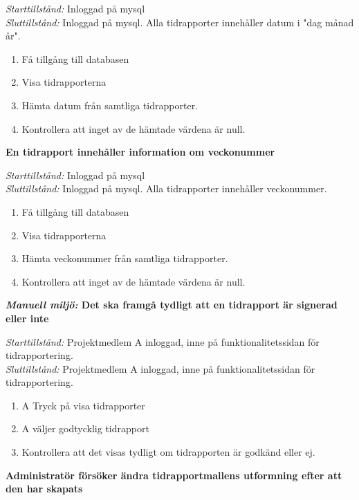 \documentclass[a4paper]{article}
\begin{document}
\begin{FT}
\emph{Starttillstånd:} Inloggad på mysql\\
\emph{Sluttillstånd:} Inloggad på mysql. Alla tidrapporter innehåller datum i "dag månad år".\\

\begin{enumerate}
\item Få tillgång till databasen
\item Visa tidrapporterna
\item Hämta datum från samtliga tidrapporter.
\item Kontrollera att inget av de hämtade värdena är null.
\end{enumerate}


\item
\textbf{En tidrapport innehåller information om veckonummer}

\emph{Starttillstånd:} Inloggad på mysql\\
\emph{Sluttillstånd:} Inloggad på mysql. Alla tidrapporter innehåller veckonummer.\\

\begin{enumerate}
\item Få tillgång till databasen
\item Visa tidrapporterna
\item Hämta veckonummer från samtliga tidrapporter.
\item Kontrollera att inget av de hämtade värdena är null.
\end{enumerate}


\item
\textbf{\emph{Manuell miljö:} Det ska framgå tydligt att en tidrapport är signerad eller inte}

\emph{Starttillstånd:} Projektmedlem A inloggad, inne på funktionalitetssidan för tidrapportering.\\
\emph{Sluttillstånd:} Projektmedlem A inloggad, inne på funktionalitetssidan för tidrapportering.

\begin{enumerate}
\item A Tryck på visa tidrapporter
\item A väljer godtycklig tidrapport
\item Kontrollera att det visas tydligt om tidrapporten är godkänd eller ej.
\end{enumerate}


\item
\textbf{Administratör försöker ändra tidrapportmallens utformning efter att den har
skapats}


\end{FT}
\end{document}
